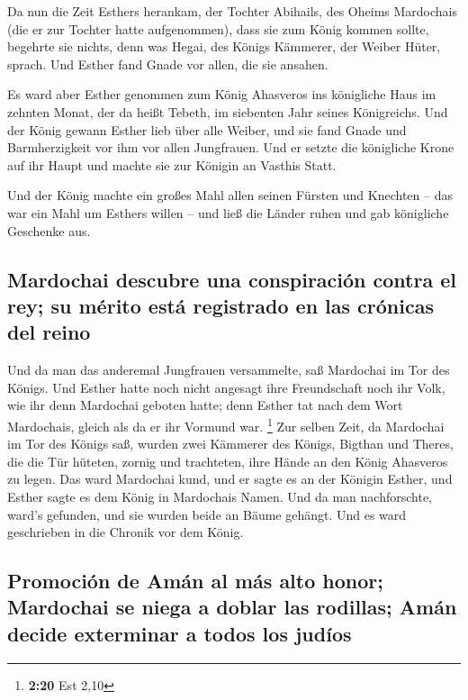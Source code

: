  Da nun die Zeit Esthers herankam, der Tochter Abihails,
des Oheims Mardochais (die er zur Tochter hatte aufgenommen), dass sie
zum König kommen sollte, begehrte sie nichts, denn was Hegai, des Königs
Kämmerer, der Weiber Hüter, sprach. Und Esther fand Gnade vor allen, die
sie ansahen.

 Es ward aber Esther genommen zum König Ahasveros ins
königliche Haus im zehnten Monat, der da heißt Tebeth, im siebenten Jahr
seines Königreichs.  Und der König gewann Esther lieb
über alle Weiber, und sie fand Gnade und Barmherzigkeit vor ihm vor
allen Jungfrauen. Und er setzte die königliche Krone auf ihr Haupt und
machte sie zur Königin an Vasthis Statt.

 Und der König machte ein großes Mahl allen seinen
Fürsten und Knechten -- das war ein Mahl um Esthers willen -- und ließ
die Länder ruhen und gab königliche Geschenke aus.

\hypertarget{mardochai-descubre-una-conspiraciuxf3n-contra-el-rey-su-muxe9rito-estuxe1-registrado-en-las-cruxf3nicas-del-reino}{%
\subsection{Mardochai descubre una conspiración contra el rey; su mérito
está registrado en las crónicas del
reino}\label{mardochai-descubre-una-conspiraciuxf3n-contra-el-rey-su-muxe9rito-estuxe1-registrado-en-las-cruxf3nicas-del-reino}}

 Und da man das anderemal Jungfrauen versammelte, saß
Mardochai im Tor des Königs.  Und Esther hatte noch nicht
angesagt ihre Freundschaft noch ihr Volk, wie ihr denn Mardochai geboten
hatte; denn Esther tat nach dem Wort Mardochais, gleich als da er ihr
Vormund war. \footnote{\textbf{2:20} Est 2,10}  Zur
selben Zeit, da Mardochai im Tor des Königs saß, wurden zwei Kämmerer
des Königs, Bigthan und Theres, die die Tür hüteten, zornig und
trachteten, ihre Hände an den König Ahasveros zu legen. 
Das ward Mardochai kund, und er sagte es an der Königin Esther, und
Esther sagte es dem König in Mardochais Namen.  Und da
man nachforschte, ward's gefunden, und sie wurden beide an Bäume
gehängt. Und es ward geschrieben in die Chronik vor dem König.

\hypertarget{promociuxf3n-de-amuxe1n-al-muxe1s-alto-honor-mardochai-se-niega-a-doblar-las-rodillas-amuxe1n-decide-exterminar-a-todos-los-juduxedos}{%
\subsection{Promoción de Amán al más alto honor; Mardochai se niega a
doblar las rodillas; Amán decide exterminar a todos los
judíos}\label{promociuxf3n-de-amuxe1n-al-muxe1s-alto-honor-mardochai-se-niega-a-doblar-las-rodillas-amuxe1n-decide-exterminar-a-todos-los-juduxedos}}

